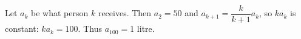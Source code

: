 Let $a_k$ be what person $k$ receives. Then $a_2=50$ and $a_{k+1}=\dfrac k{k+1}a_k$, so $ka_k$ is constant: $ka_k=100$. Thus $a_{100}=\boxed{1}$ litre.
